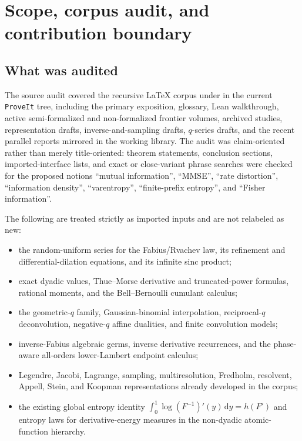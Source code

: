 \documentclass[11pt,oneside]{article}
\theoremstyle{definition}
\theoremstyle{remark}
\newcommand{\dd}{\,\mathrm d}
\begin{document}
\tableofcontents
\newpage

\section{Scope, corpus audit, and contribution boundary}
\label{sec:scope}

\subsection{What was audited}

The source audit covered the recursive LaTeX corpus under
 in the current \texttt{ProveIt} tree, including
the primary exposition, glossary, Lean walkthrough, active semi-formalized and
non-formalized frontier volumes, archived studies, representation drafts,
inverse-and-sampling drafts, $q$-series drafts, and the recent parallel reports
mirrored in the working library.  The audit was claim-oriented rather than merely
title-oriented: theorem statements, conclusion sections, imported-interface
lists, and exact or close-variant phrase searches were checked for the proposed
notions ``mutual information'', ``MMSE'', ``rate distortion'', ``information
density'', ``varentropy'', ``finite-prefix entropy'', and ``Fisher information''.

The following are treated strictly as imported inputs and are not relabeled as
new:
\begin{itemize}
\item the random-uniform series for the Fabius/Rvachev law, its refinement and
      differential-dilation equations, and its infinite sinc product;
\item exact dyadic values, Thue--Morse derivative and truncated-power formulas,
      rational moments, and the Bell--Bernoulli cumulant calculus;
\item the geometric-$q$ family, Gaussian-binomial interpolation, reciprocal-$q$
      deconvolution, negative-$q$ affine dualities, and finite convolution models;
\item inverse-Fabius algebraic germs, inverse derivative recurrences, and the
      phase-aware all-orders lower-Lambert endpoint calculus;
\item Legendre, Jacobi, Lagrange, sampling, multiresolution, Fredholm, resolvent,
      Appell, Stein, and Koopman representations already developed in the corpus;
\item the existing global entropy identity
      $\int_0^1\log (F^{-1})'(y)\dd y=h(F')$ and entropy laws for derivative-energy
      measures in the non-dyadic atomic-function hierarchy.
\end{itemize}
\end{document}
